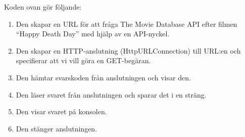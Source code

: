 \begin{Shaded}
\begin{Highlighting}[]
            \OperatorTok{=}\OperatorTok{();}
            \OperatorTok{(} \OperatorTok{+}\OperatorTok{);}

            \OperatorTok{=}  \OperatorTok{(} \OperatorTok{(}\OperatorTok{()));}
            \OperatorTok{;}
            \OperatorTok{=}  \OperatorTok{();}
             \OperatorTok{((}\OperatorTok{=}\OperatorTok{())} \OperatorTok{!=} \OperatorTok{)} \OperatorTok{\{}
\OperatorTok{(}\OperatorTok{);}
            \OperatorTok{\}}
\OperatorTok{();}

            \OperatorTok{(}\OperatorTok{());}

\OperatorTok{();}
        \OperatorTok{\}}  \OperatorTok{(}\OperatorTok{)} \OperatorTok{\{}
\OperatorTok{();}
        \OperatorTok{\}}
    \OperatorTok{\}}
\OperatorTok{\}}
\end{Highlighting}
\end{Shaded}

Koden ovan gör följande:

\begin{enumerate}
\def\labelenumi{\arabic{enumi}.}
\tightlist
\item
  Den skapar en URL för att fråga The Movie Database API efter filmen
  ``Happy Death Day'' med hjälp av en API-nyckel.
\item
  Den skapar en HTTP-anslutning (HttpURLConnection) till URL:en och
  specifierar att vi vill göra en GET-begäran.
\item
  Den hämtar svarskoden från anslutningen och visar den.
\item
  Den läser svaret från anslutningen och sparar det i en sträng.
\item
  Den visar svaret på konsolen.
\item
  Den stänger anslutningen.
\end{enumerate}

